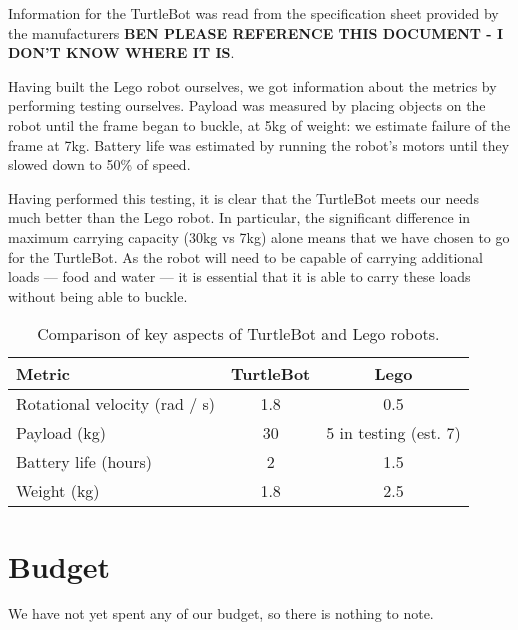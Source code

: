 \documentclass{article}
\begin{document}
Information for the TurtleBot was read from the specification sheet provided by the manufacturers {\bf BEN PLEASE REFERENCE THIS DOCUMENT - I DON'T KNOW WHERE IT IS}.

Having built the Lego robot ourselves, we got information about the metrics by performing testing ourselves. Payload was measured by placing objects on the robot until the frame began to buckle, at 5kg of weight: we estimate failure of the frame at 7kg. Battery life was estimated by running the robot's motors until they slowed down to 50\% of speed. 

Having performed this testing, it is clear that the TurtleBot meets our needs much better than the Lego robot. In particular, the significant difference in maximum carrying capacity (30kg vs 7kg) alone means that we have chosen to go for the TurtleBot. As the robot will need to be capable of carrying additional loads --- food and water --- it is essential that it is able to carry these loads without being able to buckle.


\begin{table}[h]
\vskip 3mm
\begin{center}
\begin{small}
\begin{sc}
\begin{tabular}{lcc}
\hline
\abovespace\belowspace
Metric & TurtleBot & Lego \\
\hline
  Rotational velocity (rad / s) & 1.8 & 0.5 \\
  Payload (kg) & 30 & 5 in testing (est. 7) \\
  Battery life (hours) & 2 & 1.5 \\
  Weight (kg) & 1.8 & 2.5 
\end{tabular}
\end{sc}
\end{small}
\caption{Comparison of key aspects of TurtleBot and Lego robots.}
\label{tab:sample-table}
\end{center}
\vskip -3mm
\end{table}


\section{Budget}
We have not yet spent any of our budget, so there is nothing to note. 



\end{document}
